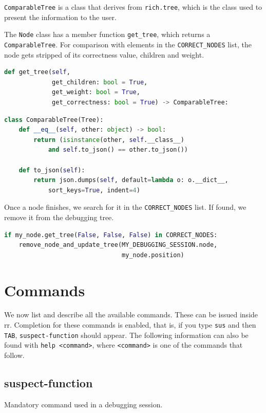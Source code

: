 \verb|ComparableTree| is a class that derives from \verb|rich.tree|, which is the class used to present the information to the user.

The \verb|Node| class has a member function \verb|get_tree|, which returns a \verb|ComparableTree|.
For comparison with elements in the \verb|CORRECT_NODES| list, the node gets stripped of its correctness value, children and weight. 
\begin{lstlisting}[language=Python, caption={Node class method signature for getting a comparable tree}]
def get_tree(self,
             get_children: bool = True,
             get_weight: bool = True,
             get_correctness: bool = True) -> ComparableTree:
\end{lstlisting}
\begin{lstlisting}[language=Python, caption=Comparable tree class]
class ComparableTree(Tree):
    def __eq__(self, other: object) -> bool:
        return (isinstance(other, self.__class__)
            and self.to_json() == other.to_json())

    def to_json(self):
        return json.dumps(self, default=lambda o: o.__dict__,
            sort_keys=True, indent=4)
\end{lstlisting}

Once a node finishes, we search for it in the \verb|CORRECT_NODES| list. If found, we remove it from the debugging tree.
\begin{lstlisting}[language=Python, caption=Removing finished node from tree if it is correct]
if my_node.get_tree(False, False, False) in CORRECT_NODES:
    remove_node_and_update_tree(MY_DEBUGGING_SESSION.node,
                                my_node.position)
\end{lstlisting}

\section{Commands}
We now list and describe all the available commands. These can be issued inside rr. Completion for these commands is enabled, that is, if you type \verb|sus| and then \verb|TAB|, \verb|suspect-function| should appear.
The following information can also be found with \verb|help <command>|, where \verb|<command>| is one of the commands that follow.

\subsection{suspect-function}
\label{command:suspect-function}
Mandatory command used in a debugging session.

